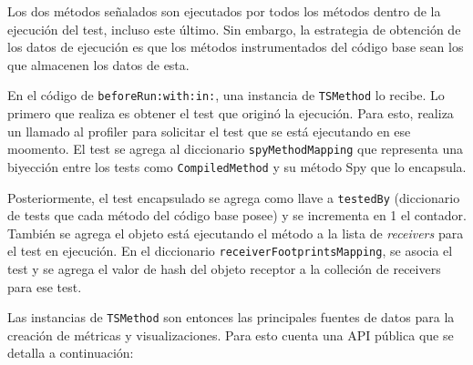 \par Los dos métodos señalados son ejecutados por todos los métodos dentro de la ejecución del test, incluso este último. Sin embargo, la estrategia de obtención de los datos de ejecución es que los métodos instrumentados del código base sean los que almacenen los datos de esta. 

\par En el código de {\tt beforeRun:with:in:}, una instancia de {\tt TSMethod} lo recibe. Lo primero que realiza es obtener el test que originó la ejecución. Para esto, realiza un llamado al profiler para solicitar el test que se está ejecutando en ese moomento. El test se agrega al diccionario {\tt spyMethodMapping} que representa una biyección entre los tests como {\tt CompiledMethod} y su método Spy que lo encapsula. 

\par Posteriormente, el test encapsulado se agrega como llave a {\tt testedBy} (diccionario de tests que cada método del código base posee) y se incrementa en 1 el contador. También se agrega el objeto está ejecutando el método a la lista de \emph{receivers} para el test en ejecución. En el diccionario {\tt receiverFootprintsMapping}, se asocia el test y se agrega el valor de hash del objeto receptor a la colleción de receivers para ese test.

\par Las instancias de {\tt TSMethod} son entonces las principales fuentes de datos para la creación de métricas y visualizaciones. Para esto cuenta una API pública que se detalla a continuación:  

